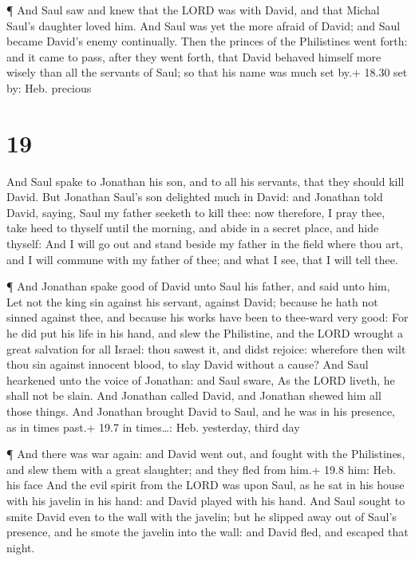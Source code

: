  ¶ And Saul saw and knew that the LORD was with David, and
that Michal Saul's daughter loved him.  And Saul was yet
the more afraid of David; and Saul became David's enemy continually.
 Then the princes of the Philistines went forth: and it
came to pass, after they went forth, that David behaved himself more
wisely than all the servants of Saul; so that his name was much set by.+
18.30 set by: Heb. precious

\hypertarget{section-18}{%
\section{19}\label{section-18}}

 And Saul spake to Jonathan his son, and to all his
servants, that they should kill David.  But Jonathan Saul's
son delighted much in David: and Jonathan told David, saying, Saul my
father seeketh to kill thee: now therefore, I pray thee, take heed to
thyself until the morning, and abide in a secret place, and hide
thyself:  And I will go out and stand beside my father in
the field where thou art, and I will commune with my father of thee; and
what I see, that I will tell thee.

 ¶ And Jonathan spake good of David unto Saul his father,
and said unto him, Let not the king sin against his servant, against
David; because he hath not sinned against thee, and because his works
have been to thee-ward very good:  For he did put his life
in his hand, and slew the Philistine, and the LORD wrought a great
salvation for all Israel: thou sawest it, and didst rejoice: wherefore
then wilt thou sin against innocent blood, to slay David without a
cause?  And Saul hearkened unto the voice of Jonathan: and
Saul sware, As the LORD liveth, he shall not be slain.  And
Jonathan called David, and Jonathan shewed him all those things. And
Jonathan brought David to Saul, and he was in his presence, as in times
past.+ 19.7 in times\ldots: Heb. yesterday, third day

 ¶ And there was war again: and David went out, and fought
with the Philistines, and slew them with a great slaughter; and they
fled from him.+ 19.8 him: Heb. his face  And the evil spirit
from the LORD was upon Saul, as he sat in his house with his javelin in
his hand: and David played with his hand.  And Saul sought
to smite David even to the wall with the javelin; but he slipped away
out of Saul's presence, and he smote the javelin into the wall: and
David fled, and escaped that night.


